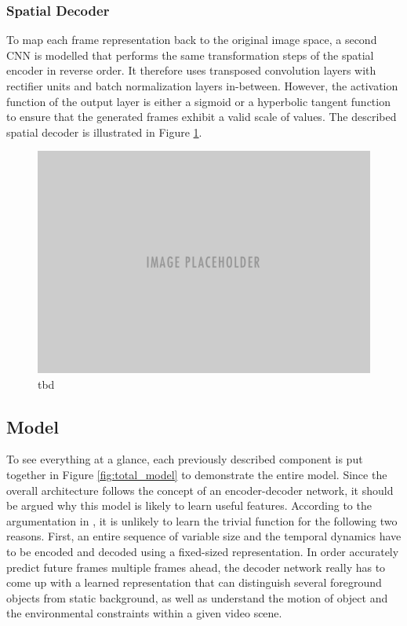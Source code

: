 \subsubsection{Spatial Decoder}

To map each frame representation back to the original image space, a second CNN is modelled that performs the same transformation steps of the spatial encoder in reverse order. It therefore uses transposed convolution layers with rectifier units and batch normalization layers in-between. However, the activation function of the output layer is either a sigmoid or a hyperbolic tangent function to ensure that the generated frames exhibit a valid scale of values. The described spatial decoder is illustrated in Figure \ref{fig:comp-spatial_decoder}.

\begin{figure}[htb]
	\centering
	\includegraphics[width=0.6\linewidth]{figures/placeholder.png} 
	\caption[Spatial Decoder Component]{tbd} \label{fig:comp-spatial_decoder}
\end{figure}


\subsection{Model}

To see everything at a glance, each previously described component is put together in Figure \ref{fig:total_model} to demonstrate the entire model. Since the overall architecture follows the concept of an encoder-decoder network, it should be argued why this model is likely to learn useful features. According to the argumentation in \parencite[p. 3f.]{unsup_learn_lstm}, it is unlikely to learn the trivial function for the following two reasons. First, an entire sequence of variable size and the temporal dynamics have to be encoded and decoded using a fixed-sized representation. In order accurately predict future frames multiple frames ahead, the decoder network really has to come up with a learned representation that can distinguish several foreground objects from static background, as well as understand the motion of object and the environmental constraints within a given video scene.

